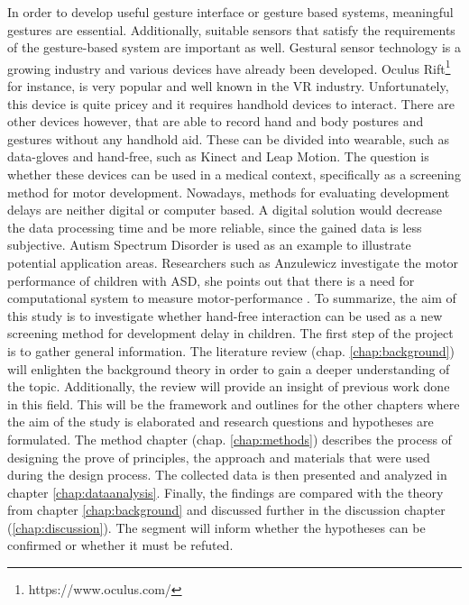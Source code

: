In order to develop useful gesture interface or gesture based systems, meaningful gestures are essential. Additionally, suitable sensors that satisfy the requirements of the gesture-based system are important as well.
Gestural sensor technology is a growing industry and various devices have already been developed. Oculus Rift\footnote{https://www.oculus.com/} for instance, is very popular and well known in the VR industry. Unfortunately, this device is quite pricey and it requires handhold devices to interact. There are other devices however, that are able to record hand and body postures and gestures without any handhold aid.
These can be divided into wearable, such as data-gloves \cite{Gupta2001} and hand-free, such as Kinect and Leap Motion.
The question is whether these devices can be used in a medical context, specifically as a screening method for motor development. Nowadays, methods for evaluating development delays are neither digital or computer based. A digital solution would decrease the data processing time and be more reliable, since the gained data is less subjective. Autism Spectrum Disorder is used as an example to illustrate potential application areas. Researchers such as Anzulewicz investigate the motor performance of children with ASD, she points out that there is a need for computational system to measure motor-performance \cite{Anzulewicz2016}. 
\newline
To summarize, the aim of this study is to investigate whether hand-free interaction can be used as a new screening method for development delay in children.
\newline
The first step of the project is to gather general information. The literature review (chap. \ref{chap:background}) will enlighten the background theory in order to gain a deeper understanding of the topic. Additionally, the review will provide an insight of previous work done in this field. This will be the framework and outlines for the other chapters where the aim of the study is elaborated and research questions and hypotheses are formulated. The method chapter (chap. \ref{chap:methods}) describes the process of designing the prove of principles, the approach and materials that were used during the design process. The collected data is then presented and analyzed in chapter \ref{chap:dataanalysis}. Finally, the findings are compared with the theory from chapter \ref{chap:background} and discussed further in the discussion chapter (\ref{chap:discussion}). The segment will inform whether the hypotheses can be confirmed or whether it must be refuted.


